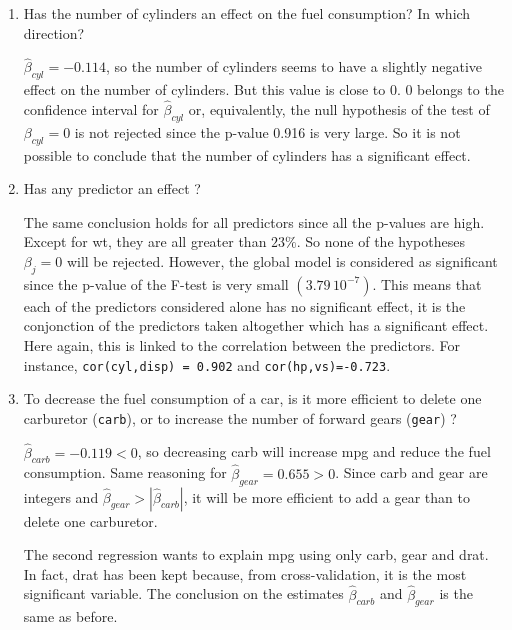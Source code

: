 \documentclass[12pt]{article}
\newcommand \noi \noindent
\def\v3{\vspace{3mm}}
\begin{document}
\v3

\begin{enumerate}

\item Has the number of cylinders  an effect on  the fuel consumption? In which  direction?

\v3

\noi {\it Indications.} $\hat{\beta}_{cyl} = -0.114$, so the number of cylinders seems to have a slightly negative effect on the number of cylinders. But this value is close to 0. 0 belongs to the confidence interval for $\hat{\beta}_{cyl}$ or, equivalently, the null hypothesis of the test of $\beta_{cyl}=0$ is not rejected since the p-value 0.916 is very large. So it is not possible to conclude that the number of cylinders has a significant effect.

\v3

\item Has any predictor an effect ?

\v3

\noi {\it Indications.} The same conclusion holds for all predictors since all the p-values are high. Except for wt, they are all greater than $23\%$. So none of the hypotheses $\beta_{j}=0$ will be rejected. However, the global model is considered as significant since the p-value of the F-test is very small $(3.79 \, 10^{-7})$. This means that each of the predictors considered alone has no significant effect, it is the conjonction of the predictors taken altogether which has a significant effect. Here again, this is linked to the correlation between the predictors. For instance, {\tt cor(cyl,disp) = 0.902} and {\tt cor(hp,vs)=-0.723}.


\v3

\item To decrease the fuel consumption of a car, is it more efficient to delete one carburetor ({\tt carb}), or to increase the number of forward gears  ({\tt gear}) ?

\v3

\noi {\it Indications.} $\hat{\beta}_{carb} = -0.119 < 0$, so decreasing carb will increase mpg and reduce the fuel consumption. Same reasoning for $\hat{\beta}_{gear} = 0.655 > 0$. Since carb and gear are integers and $\hat{\beta}_{gear} > |\hat{\beta}_{carb}|$, it will be more efficient to add a gear than to delete one carburetor.

The second regression wants to explain mpg using only carb, gear and drat. In fact, drat has been kept because, from cross-validation, it is the most significant variable. The conclusion on the estimates $\hat{\beta}_{carb}$ and $\hat{\beta}_{gear}$ is the same as before.


\end{enumerate}
\end{document}
